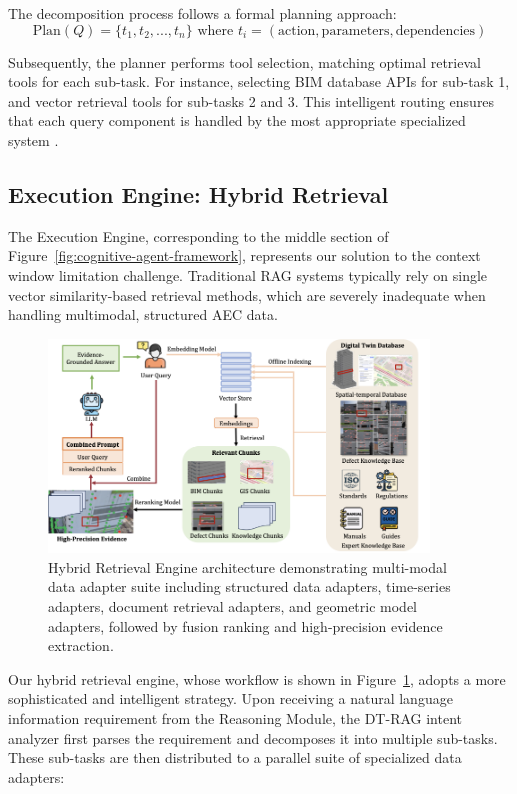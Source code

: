 The decomposition process follows a formal planning approach:
\begin{equation}
\text{Plan}(Q) = \{t_1, t_2, ..., t_n\} \text{ where } t_i = (\text{action}, \text{parameters}, \text{dependencies})
\end{equation}

Subsequently, the planner performs tool selection, matching optimal retrieval tools for each sub-task. For instance, selecting BIM database APIs for sub-task 1, and vector retrieval tools for sub-tasks 2 and 3. This intelligent routing ensures that each query component is handled by the most appropriate specialized system \cite{yao2022react}.

\subsection{Execution Engine: Hybrid Retrieval}

The Execution Engine, corresponding to the middle section of Figure~\ref{fig:cognitive-agent-framework}, represents our solution to the context window limitation challenge. Traditional RAG systems typically rely on single vector similarity-based retrieval methods, which are severely inadequate when handling multimodal, structured AEC data.

\begin{figure}[htbp]
\centering
\includegraphics[width=0.9\textwidth]{figures/DefectGPT/hybrid_retrieval_engine.png}
\caption{Hybrid Retrieval Engine architecture demonstrating multi-modal data adapter suite including structured data adapters, time-series adapters, document retrieval adapters, and geometric model adapters, followed by fusion ranking and high-precision evidence extraction.}
\label{fig:hybrid-retrieval-engine}
\end{figure}

Our hybrid retrieval engine, whose workflow is shown in Figure~\ref{fig:hybrid-retrieval-engine}, adopts a more sophisticated and intelligent strategy. Upon receiving a natural language information requirement from the Reasoning Module, the DT-RAG intent analyzer first parses the requirement and decomposes it into multiple sub-tasks. These sub-tasks are then distributed to a parallel suite of specialized data adapters:

